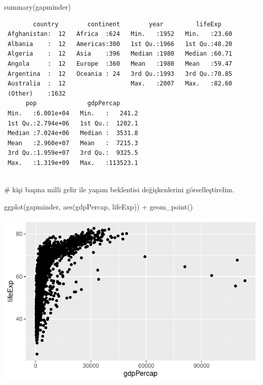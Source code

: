 \documentclass[
  letterpaper,
  DIV=11,
  numbers=noendperiod]{scrreprt}
\newenvironment{Shaded}{\begin{snugshade}}{\end{snugshade}}
\newcommand{\CommentTok}[1]{\textcolor[rgb]{0.37,0.37,0.37}{#1}}
\newcommand{\FunctionTok}[1]{\textcolor[rgb]{0.28,0.35,0.67}{#1}}
\newcommand{\NormalTok}[1]{\textcolor[rgb]{0.00,0.23,0.31}{#1}}
\newcommand{\SpecialCharTok}[1]{\textcolor[rgb]{0.37,0.37,0.37}{#1}}
\begin{document}
\begin{Shaded}
\begin{Highlighting}[]
\FunctionTok{summary}\NormalTok{(gapminder)}
\end{Highlighting}
\end{Shaded}

\begin{verbatim}
        country        continent        year         lifeExp     
 Afghanistan:  12   Africa  :624   Min.   :1952   Min.   :23.60  
 Albania    :  12   Americas:300   1st Qu.:1966   1st Qu.:48.20  
 Algeria    :  12   Asia    :396   Median :1980   Median :60.71  
 Angola     :  12   Europe  :360   Mean   :1980   Mean   :59.47  
 Argentina  :  12   Oceania : 24   3rd Qu.:1993   3rd Qu.:70.85  
 Australia  :  12                  Max.   :2007   Max.   :82.60  
 (Other)    :1632                                                
      pop              gdpPercap       
 Min.   :6.001e+04   Min.   :   241.2  
 1st Qu.:2.794e+06   1st Qu.:  1202.1  
 Median :7.024e+06   Median :  3531.8  
 Mean   :2.960e+07   Mean   :  7215.3  
 3rd Qu.:1.959e+07   3rd Qu.:  9325.5  
 Max.   :1.319e+09   Max.   :113523.1  
                                       
\end{verbatim}

\begin{Shaded}
\begin{Highlighting}[]
\CommentTok{\# kişi başına milli gelir ile yaşam beklentisi değişkenlerini görselleştirelim.}

\FunctionTok{ggplot}\NormalTok{(gapminder, }\FunctionTok{aes}\NormalTok{(gdpPercap, lifeExp)) }\SpecialCharTok{+}
  \FunctionTok{geom\_point}\NormalTok{()}
\end{Highlighting}
\end{Shaded}

\includegraphics{regresyon_files/figure-pdf/unnamed-chunk-1-1.pdf}
\end{document}
